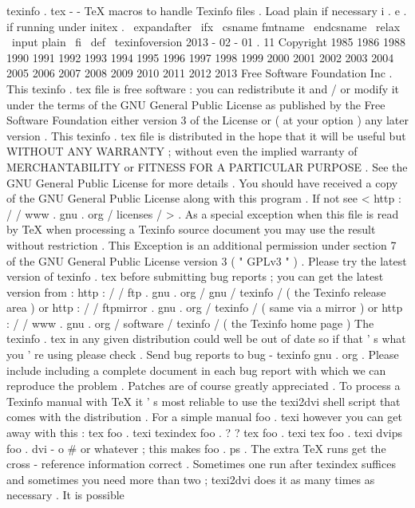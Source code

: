%
texinfo
.
tex
-
-
TeX
macros
to
handle
Texinfo
files
.
%
%
Load
plain
if
necessary
i
.
e
.
if
running
under
initex
.
\
expandafter
\
ifx
\
csname
fmtname
\
endcsname
\
relax
\
input
plain
\
fi
%
\
def
\
texinfoversion
{
2013
-
02
-
01
.
11
}
%
%
Copyright
1985
1986
1988
1990
1991
1992
1993
1994
1995
%
1996
1997
1998
1999
2000
2001
2002
2003
2004
2005
2006
%
2007
2008
2009
2010
2011
2012
2013
Free
Software
Foundation
Inc
.
%
%
This
texinfo
.
tex
file
is
free
software
:
you
can
redistribute
it
and
/
or
%
modify
it
under
the
terms
of
the
GNU
General
Public
License
as
%
published
by
the
Free
Software
Foundation
either
version
3
of
the
%
License
or
(
at
your
option
)
any
later
version
.
%
%
This
texinfo
.
tex
file
is
distributed
in
the
hope
that
it
will
be
%
useful
but
WITHOUT
ANY
WARRANTY
;
without
even
the
implied
warranty
%
of
MERCHANTABILITY
or
FITNESS
FOR
A
PARTICULAR
PURPOSE
.
See
the
GNU
%
General
Public
License
for
more
details
.
%
%
You
should
have
received
a
copy
of
the
GNU
General
Public
License
%
along
with
this
program
.
If
not
see
<
http
:
/
/
www
.
gnu
.
org
/
licenses
/
>
.
%
%
As
a
special
exception
when
this
file
is
read
by
TeX
when
processing
%
a
Texinfo
source
document
you
may
use
the
result
without
%
restriction
.
This
Exception
is
an
additional
permission
under
section
7
%
of
the
GNU
General
Public
License
version
3
(
"
GPLv3
"
)
.
%
%
Please
try
the
latest
version
of
texinfo
.
tex
before
submitting
bug
%
reports
;
you
can
get
the
latest
version
from
:
%
http
:
/
/
ftp
.
gnu
.
org
/
gnu
/
texinfo
/
(
the
Texinfo
release
area
)
or
%
http
:
/
/
ftpmirror
.
gnu
.
org
/
texinfo
/
(
same
via
a
mirror
)
or
%
http
:
/
/
www
.
gnu
.
org
/
software
/
texinfo
/
(
the
Texinfo
home
page
)
%
The
texinfo
.
tex
in
any
given
distribution
could
well
be
out
%
of
date
so
if
that
'
s
what
you
'
re
using
please
check
.
%
%
Send
bug
reports
to
bug
-
texinfo
gnu
.
org
.
Please
include
including
a
%
complete
document
in
each
bug
report
with
which
we
can
reproduce
the
%
problem
.
Patches
are
of
course
greatly
appreciated
.
%
%
To
process
a
Texinfo
manual
with
TeX
it
'
s
most
reliable
to
use
the
%
texi2dvi
shell
script
that
comes
with
the
distribution
.
For
a
simple
%
manual
foo
.
texi
however
you
can
get
away
with
this
:
%
tex
foo
.
texi
%
texindex
foo
.
?
?
%
tex
foo
.
texi
%
tex
foo
.
texi
%
dvips
foo
.
dvi
-
o
#
or
whatever
;
this
makes
foo
.
ps
.
%
The
extra
TeX
runs
get
the
cross
-
reference
information
correct
.
%
Sometimes
one
run
after
texindex
suffices
and
sometimes
you
need
more
%
than
two
;
texi2dvi
does
it
as
many
times
as
necessary
.
%
%
It
is
possible
